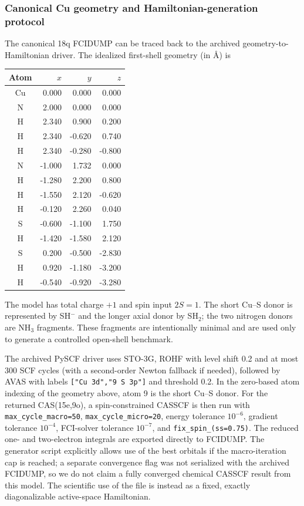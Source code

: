 \documentclass[
 aip,
 jcp,
 amsmath,amssymb,
 preprint
]{revtex4-2}
\begin{document}
\subsubsection{Canonical Cu geometry and Hamiltonian-generation protocol}

The canonical 18q FCIDUMP can be traced back to the archived geometry-to-Hamiltonian driver.
The idealized first-shell geometry (in \AA) is
\begin{center}
\begin{tabular}{crrr}
\toprule
Atom & $x$ & $y$ & $z$\\
\midrule
Cu &  0.000 &  0.000 &  0.000\\
N  &  2.000 &  0.000 &  0.000\\
H  &  2.340 &  0.900 &  0.200\\
H  &  2.340 & -0.620 &  0.740\\
H  &  2.340 & -0.280 & -0.800\\
N  & -1.000 &  1.732 &  0.000\\
H  & -1.280 &  2.200 &  0.800\\
H  & -1.550 &  2.120 & -0.620\\
H  & -0.120 &  2.260 &  0.040\\
S  & -0.600 & -1.100 &  1.750\\
H  & -1.420 & -1.580 &  2.120\\
S  &  0.200 & -0.500 & -2.830\\
H  &  0.920 & -1.180 & -3.200\\
H  & -0.540 & -0.920 & -3.280\\
\bottomrule
\end{tabular}
\end{center}
The model has total charge $+1$ and spin input $2S=1$.
The short Cu--S donor is represented by SH$^-$ and the longer axial donor by SH$_2$; the two nitrogen donors are NH$_3$ fragments.
These fragments are intentionally minimal and are used only to generate a controlled open-shell benchmark.

The archived PySCF driver uses STO-3G, ROHF with level shift 0.2 and at most 300 SCF cycles (with a second-order Newton fallback if needed), followed by AVAS with labels
\texttt{["Cu 3d","9 S 3p"]} and threshold 0.2.
In the zero-based atom indexing of the geometry above, atom 9 is the short Cu--S donor.
For the returned CAS(15e,9o), a spin-constrained CASSCF is then run with
\texttt{max\_cycle\_macro=50}, \texttt{max\_cycle\_micro=20},
energy tolerance $10^{-6}$, gradient tolerance $10^{-4}$,
FCI-solver tolerance $10^{-7}$, and \texttt{fix\_spin\_(ss=0.75)}.
The reduced one- and two-electron integrals are exported directly to FCIDUMP.
The generator script explicitly allows use of the best orbitals if the macro-iteration cap is reached; a separate convergence flag was not serialized with the archived FCIDUMP, so we do not claim a fully converged chemical CASSCF result from this model.
The scientific use of the file is instead as a fixed, exactly diagonalizable active-space Hamiltonian.
\end{document}
